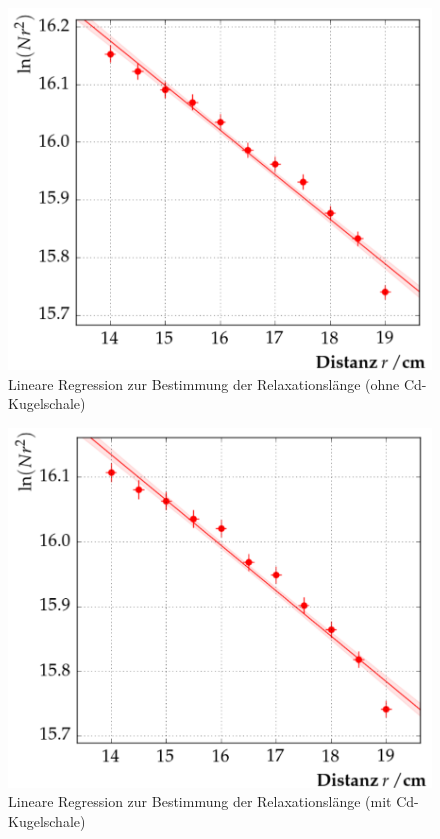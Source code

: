 \begin{figure}[tb]
  \centering
  \includegraphics[scale=0.5]{./fig/plot1.png}
  \caption{Lineare Regression zur Bestimmung der Relaxationslänge (ohne Cd-Kugelschale)}
  \label{fig:plot1}
\end{figure}

\begin{figure}[tb]
  \centering
  \includegraphics[scale=0.5]{./fig/plot2.png}
  \caption{Lineare Regression zur Bestimmung der Relaxationslänge (mit Cd-Kugelschale)}
  \label{fig:plot2}
\end{figure}


